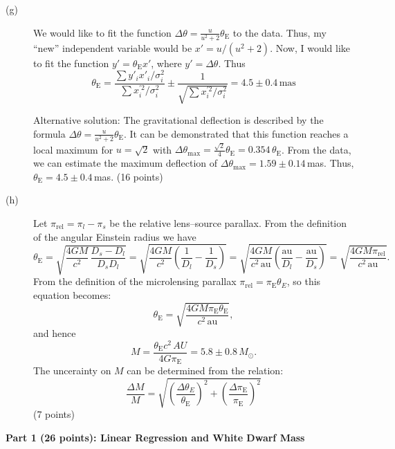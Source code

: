 \begin{description}
\item[(g)] We would like to fit the function
  $\Delta\theta = \frac{u}{u^2+2}\theta_{\mathrm{E}}$ to the data. Thus, my
  ``new'' independent variable would be $x' = u/(u^2+2)$. Now, I would like
  to fit the function $y' = \theta_{\mathrm{E}} x'$, where
  $y' = \Delta\theta$. Thus
  \[
    \theta_{\mathrm{E}}
    = \frac{\sum y'_i x'_i/\sigma_i^2}{\sum x_i^{\prime 2}/\sigma_i^2}
      \pm \frac{1}{\sqrt{\sum x_i^{\prime 2}/\sigma_i^2}}
    = 4.5 \pm 0.4\,\mathrm{mas}
  \]

  Alternative solution: The gravitational deflection is described by the
  formula $\Delta\theta = \frac{u}{u^2+2}\theta_{\mathrm{E}}$. It can be
  demonstrated that this function reaches a local maximum for
  $u = \sqrt{2}$ with
  $\Delta\theta_{\mathrm{max}} = \frac{\sqrt{2}}{4}\theta_{\mathrm{E}}
  = 0.354\,\theta_{\mathrm{E}}$. From the data, we can estimate the maximum
  deflection of $\Delta\theta_{\mathrm{max}} = 1.59 \pm 0.14$\,mas. Thus,
  $\theta_{\mathrm{E}} = 4.5 \pm 0.4$\,mas. \hfill(16 points)

\item[(h)] Let $\pi_{\mathrm{rel}} = \pi_l - \pi_s$ be the relative
  lens--source parallax. From the definition of the angular Einstein radius
  we have
  \[
    \theta_{\mathrm{E}}
    = \sqrt{\frac{4GM}{c^2}\,\frac{D_s - D_l}{D_s D_l}}
    = \sqrt{\frac{4GM}{c^2}\left(\frac{1}{D_l} - \frac{1}{D_s}\right)}
    = \sqrt{\frac{4GM}{c^2\,\mathrm{au}}
      \left(\frac{\mathrm{au}}{D_l} - \frac{\mathrm{au}}{D_s}\right)}
    = \sqrt{\frac{4GM\pi_{\mathrm{rel}}}{c^2\,\mathrm{au}}}.
  \]
  From the definition of the microlensing parallax
  $\pi_{\mathrm{rel}} = \pi_{\mathrm{E}}\theta_E$, so this equation
  becomes:
  \[
    \theta_{\mathrm{E}}
    = \sqrt{\frac{4GM\pi_{\mathrm{E}}\theta_{\mathrm{E}}}{c^2\,\mathrm{au}}},
  \]
  and hence
  \[
    M = \frac{\theta_{\mathrm{E}} c^2\,AU}{4G\pi_{\mathrm{E}}}
    = 5.8 \pm 0.8\,M_\odot.
  \]
  The uncerainty%
  {} on $M$ can be determined from the relation:
  \[
    \frac{\Delta M}{M}
    = \sqrt{\left(\frac{\Delta\theta_E}{\theta_{\mathrm{E}}}\right)^2
      + \left(\frac{\Delta\pi_{\mathrm{E}}}{\pi_{\mathrm{E}}}\right)^2}
  \]
  \hfill(7 points)
\end{description}

\medskip\noindent\textbf{Part 1 (26 points): Linear Regression and White Dwarf Mass}

